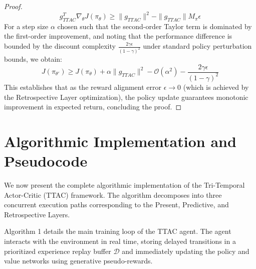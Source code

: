 \documentclass[manuscript, screen, review]{jair}
\begin{document}
\begin{proof}
\begin{equation*}
    g_{TTAC}^T \nabla_\theta J(\pi_\theta) \ge \| g_{TTAC} \|^2 - \| g_{TTAC} \| M_\pi \epsilon
\end{equation*}
For a step size $\alpha$ chosen such that the second-order Taylor term is dominated by the first-order improvement, and noting that the performance difference is bounded by the discount complexity $\frac{2\gamma \epsilon}{(1-\gamma)^2}$ under standard policy perturbation bounds, we obtain:
\begin{equation*}
    J(\pi_{\theta'}) \ge J(\pi_\theta) + \alpha \| g_{TTAC} \|^2 - \mathcal{O}(\alpha^2) - \frac{2 \gamma \epsilon}{(1-\gamma)^2}
\end{equation*}
This establishes that as the reward alignment error $\epsilon \to 0$ (which is achieved by the Retrospective Layer optimization), the policy update guarantees monotonic improvement in expected return, concluding the proof.
\end{proof}

\section{Algorithmic Implementation and Pseudocode}
We now present the complete algorithmic implementation of the Tri-Temporal Actor-Critic (TTAC) framework. The algorithm decomposes into three concurrent execution paths corresponding to the Present, Predictive, and Retrospective Layers.

Algorithm 1 details the main training loop of the TTAC agent. The agent interacts with the environment in real time, storing delayed transitions in a prioritized experience replay buffer $\mathcal{D}$ and immediately updating the policy and value networks using generative pseudo-rewards.
\end{document}
